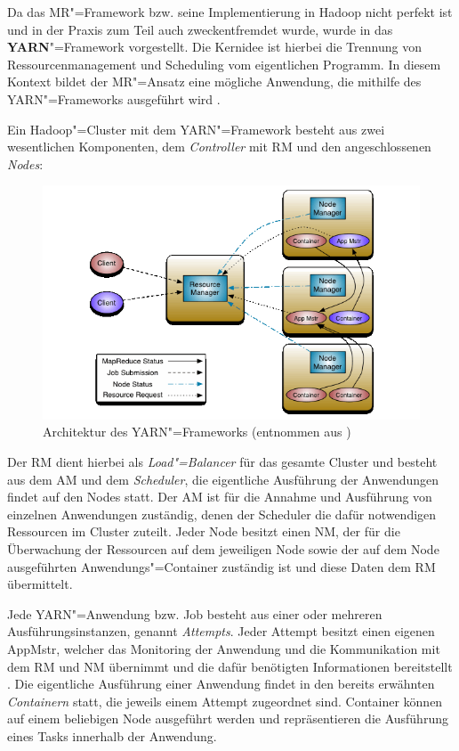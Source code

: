 Da das \ac{MR}"=Framework bzw. seine Implementierung in Hadoop nicht perfekt ist und in der Praxis zum Teil auch zweckentfremdet wurde, wurde in \cite{Vavilapalli2013} das \textbf{\ac{YARN}}"=Framework vorgestellt.
Die Kernidee ist hierbei die Trennung von Ressourcenmanagement und Scheduling vom eigentlichen Programm.
In diesem Kontext bildet der \ac{MR}"=Ansatz eine mögliche Anwendung, die mithilfe des \ac{YARN}"=Frameworks ausgeführt wird \cite{Vavilapalli2013}.

Ein Hadoop"=Cluster mit dem \ac{YARN}"=Framework besteht aus zwei wesentlichen Komponenten, dem \emph{Controller} mit \ac{RM} und den angeschlossenen \emph{Nodes}:

\begin{figure}[h]
    \includegraphics{./images/yarn_architecture.png}
    \caption[Architektur des YARN"=Frameworks]
    {Architektur des \ac{YARN}"=Frameworks (entnommen aus \cite{HadoopYarnArch271})}
    \label{fig:yarnarch}
\end{figure}

Der \ac{RM} dient hierbei als \emph{Load"=Balancer} für das gesamte Cluster und besteht aus dem \ac{AM} und dem \emph{Scheduler}, die eigentliche Ausführung der Anwendungen findet auf den Nodes statt.
Der \ac{AM} ist für die Annahme und Ausführung von einzelnen Anwendungen zuständig, denen der Scheduler die dafür notwendigen Ressourcen im Cluster zuteilt.
Jeder Node besitzt einen \ac{NM}, der für die Überwachung der Ressourcen auf dem jeweiligen Node sowie der auf dem Node ausgeführten Anwendungs"=Container zuständig ist und diese Daten dem \ac{RM} übermittelt.

Jede \ac{YARN}"=Anwendung bzw. Job besteht aus einer oder mehreren Ausführungsinstanzen, genannt \emph{Attempts}.
Jeder Attempt besitzt einen eigenen \ac{AppMstr}, welcher das Monitoring der Anwendung und die Kommunikation mit dem \ac{RM} und \ac{NM} übernimmt und die dafür benötigten Informationen bereitstellt \cite{HadoopYarnArch271}.
Die eigentliche Ausführung einer Anwendung findet in den bereits erwähnten \emph{Containern} statt, die jeweils einem Attempt zugeordnet sind.
Container können auf einem beliebigen Node ausgeführt werden und repräsentieren die Ausführung eines Tasks innerhalb der Anwendung.


